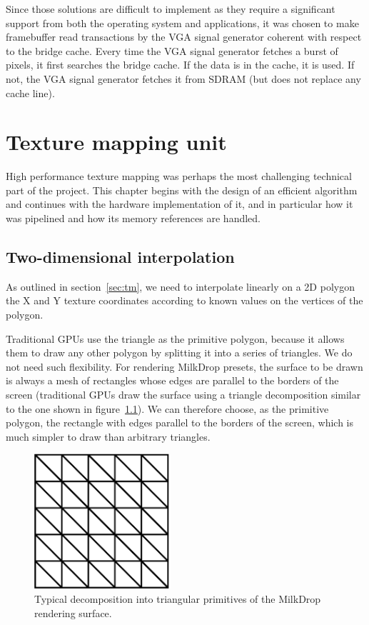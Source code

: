 \documentclass[a4paper,11pt]{kthesis}
\begin{document}
Since those solutions are difficult to implement as they require a significant support from both the operating system and applications, it was chosen to make framebuffer read transactions by the VGA signal generator coherent with respect to the bridge cache. Every time the VGA signal generator fetches a burst of pixels, it first searches the bridge cache. If the data is in the cache, it is used. If not, the VGA signal generator fetches it from SDRAM (but does not replace any cache line).

\chapter{Texture mapping unit}
\label{ch:tmu}
High performance texture mapping was perhaps the most challenging technical part of the project. This chapter begins with the design of an efficient algorithm and continues with the hardware implementation of it, and in particular how it was pipelined and how its memory references are handled.
\section{Two-dimensional interpolation}
As outlined in section~\ref{sec:tm}, we need to interpolate linearly on a 2D polygon the X and Y texture coordinates according to known values on the vertices of the polygon.

Traditional GPUs use the triangle as the primitive polygon, because it allows them to draw any other polygon by splitting it into a series of triangles. We do not need such flexibility. For rendering MilkDrop presets, the surface to be drawn is always a mesh of rectangles whose edges are parallel to the borders of the screen (traditional GPUs draw the surface using a triangle decomposition similar to the one shown in figure~\ref{fig:tridec}). We can therefore choose, as the primitive polygon, the rectangle with edges parallel to the borders of the screen, which is much simpler to draw than arbitrary triangles.

\begin{figure}[htp]
\centering
\includegraphics[height=50mm]{tridec.eps}
\caption{Typical decomposition into triangular primitives of the MilkDrop rendering surface.}
\label{fig:tridec}
\end{figure}
\end{document}
